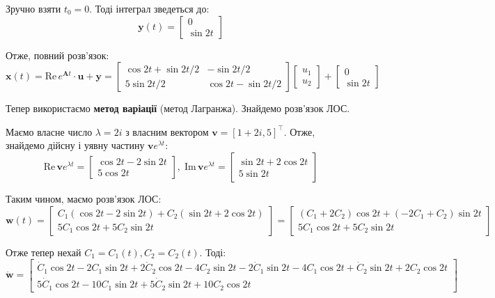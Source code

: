 \documentclass[14pt]{extarticle}
\begin{document}
Зручно взяти $t_0=0$. Тоді інтеграл зведеться до:
\[
\textbf{y}(t) = \begin{bmatrix}
    0 \\ \sin 2t
\end{bmatrix}
\]

Отже, повний розв'язок:
\[
\textbf{x}(t) = \text{Re}\, e^{\boldsymbol{A}t} \cdot \textbf{u} + \textbf{y} = \begin{bmatrix}
    \cos 2t + \sin 2t/2 & -\sin 2t/2 \\ 5\sin 2t/2 & \cos 2t - \sin 2t/2
\end{bmatrix}\begin{bmatrix}
    u_1 \\ u_2
\end{bmatrix} + \begin{bmatrix}
    0 \\ \sin 2t
\end{bmatrix}
\]

Тепер використаємо \textbf{метод варіації} (метод Лагранжа). Знайдемо розв'язок ЛОС.

Маємо власне число $\lambda=2i$ з власним вектором $\textbf{v}=[1+2i,5]^{\top}$. Отже, знайдемо дійсну і уявну частину $\textbf{v}e^{\lambda t}$:
\[
\text{Re}\,\textbf{v}e^{\lambda t} = \begin{bmatrix}
    \cos 2t - 2\sin 2t \\ 5\cos 2t
\end{bmatrix}, \; \text{Im}\,\textbf{v}e^{\lambda t} = \begin{bmatrix}
    \sin 2t + 2\cos 2t \\ 5\sin 2t
\end{bmatrix}
\]

Таким чином, маємо розв'язок ЛОС:
\[
\textbf{w}(t) = \begin{bmatrix}
    C_1(\cos 2t - 2\sin 2t) + C_2(\sin 2t + 2\cos 2t) \\ 5C_1 \cos 2t + 5 C_2 \sin 2t
\end{bmatrix} = \begin{bmatrix}
    (C_1+2C_2)\cos 2t + (-2C_1+C_2)\sin 2t \\ 
    5C_1 \cos 2t + 5C_2 \sin 2t
\end{bmatrix}
\]

Отже тепер нехай $C_1=C_1(t),C_2=C_2(t)$. Тоді:
\[
\dot{\textbf{w}} = \begin{bmatrix}
    \dot{C}_1\cos 2t - 2C_1\sin 2t + 2\dot{C}_2 \cos 2t - 4C_2 \sin 2t - 2\dot{C}_1 \sin 2t - 4C_1\cos 2t + \dot{C}_2 \sin 2t + 2C_2 \cos 2t \\ 5\dot{C}_1 \cos 2t - 10C_1 \sin 2t + 5\dot{C}_2 \sin 2t + 10 C_2 \cos 2t
\end{bmatrix} 
\]
\end{document}
